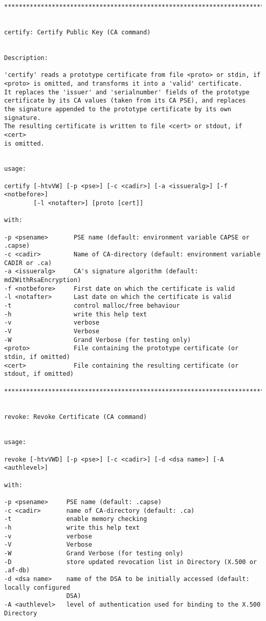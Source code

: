 {\begin{verbatim}
****************************************************************************************


certify: Certify Public Key (CA command)


Description:

'certify' reads a prototype certificate from file <proto> or stdin, if
<proto> is omitted, and transforms it into a 'valid' certificate.
It replaces the 'issuer' and 'serialnumber' fields of the prototype
certificate by its CA values (taken from its CA PSE), and replaces
the signature appended to the prototype certificate by its own signature.
The resulting certificate is written to file <cert> or stdout, if <cert>
is omitted.


usage:

certify [-htvVW] [-p <pse>] [-c <cadir>] [-a <issueralg>] [-f <notbefore>] 
        [-l <notafter>] [proto [cert]]

with:

-p <psename>       PSE name (default: environment variable CAPSE or .capse)
-c <cadir>         Name of CA-directory (default: environment variable CADIR or .ca)
-a <issueralg>     CA's signature algorithm (default: md2WithRsaEncryption)
-f <notbefore>     First date on which the certificate is valid
-l <notafter>      Last date on which the certificate is valid
-t                 control malloc/free behaviour
-h                 write this help text
-v                 verbose
-V                 Verbose
-W                 Grand Verbose (for testing only)
<proto>            File containing the prototype certificate (or stdin, if omitted)
<cert>             File containing the resulting certificate (or stdout, if omitted)

****************************************************************************************


revoke: Revoke Certificate (CA command)


usage:

revoke [-htvVWD] [-p <pse>] [-c <cadir>] [-d <dsa name>] [-A <authlevel>]

with:

-p <psename>     PSE name (default: .capse)
-c <cadir>       name of CA-directory (default: .ca)
-t               enable memory checking
-h               write this help text
-v               verbose
-V               Verbose
-W               Grand Verbose (for testing only)
-D               store updated revocation list in Directory (X.500 or .af-db)
-d <dsa name>    name of the DSA to be initially accessed (default: locally configured 
                 DSA)
-A <authlevel>   level of authentication used for binding to the X.500 Directory


\end{verbatim}}
